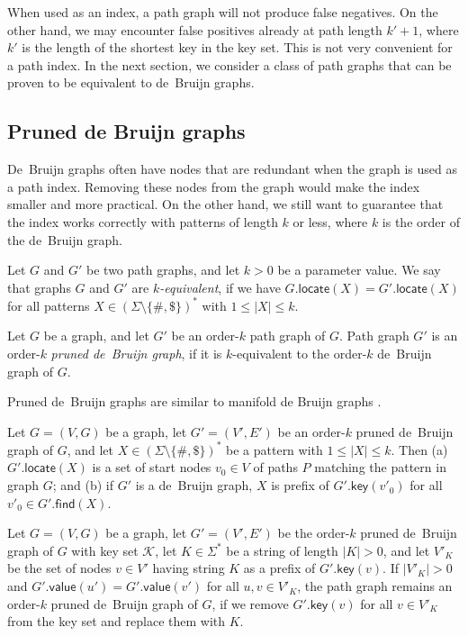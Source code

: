 \documentclass[a4paper,UKenglish]{lipics-v2016}
\newcommand{\set}[1]{\ensuremath{\{ #1 \}}}
\newcommand{\abs}[1]{\ensuremath{\lvert #1 \rvert}}
\newcommand{\find}{\ensuremath{\mathsf{find}}}
\newcommand{\locate}{\ensuremath{\mathsf{locate}}}
\newcommand{\gkey}{\ensuremath{\mathsf{key}}}
\newcommand{\gvalue}{\ensuremath{\mathsf{value}}}
\newcommand{\kequivalent}[1]{$#1$\nobreakdash-equivalent}
\newcommand{\orderk}[1]{order\nobreakdash-$#1$}
\newcommand{\patternset}{\ensuremath{(\Sigma \setminus \set{\#, \$})^{\ast}}}
\begin{document}
When used as an index, a path graph will not produce false negatives. On the other hand, we may encounter false positives already at path length $k'+1$, where $k'$ is the length of the shortest key in the key set. This is not very convenient for a path index. In the next section, we consider a class of path graphs that can be proven to be equivalent to de~Bruijn graphs.


\subsection{Pruned de Bruijn graphs}

De~Bruijn graphs often have nodes that are redundant when the graph is used as a path index. Removing these nodes from the graph would make the index smaller and more practical. On the other hand, we still want to guarantee that the index works correctly with patterns of length $k$ or less, where $k$ is the order of the de~Bruijn graph.

\begin{definition}
Let $G$ and $G'$ be two path graphs, and let $k > 0$ be a parameter value. We say that graphs $G$ and $G'$ are \emph{\kequivalent{k}}, if we have $G.\locate(X) = G'.\locate(X)$ for all patterns $X \in \patternset$ with $1 \le \abs{X} \le k$.
\end{definition}

\begin{definition}
Let $G$ be a graph, and let $G'$ be an \orderk{k} path graph of $G$. Path graph $G'$ is an \orderk{k} \emph{pruned de~Bruijn graph}, if it is \kequivalent{k} to the \orderk{k} de~Bruijn graph of $G$.
\end{definition}

Pruned de~Bruijn graphs are similar to manifold de Bruijn graphs \cite{Lin2014}.

\begin{lemma}\label{lemma:dbg-fp}
Let $G = (V, G)$ be a graph, let $G' = (V', E')$ be an \orderk{k} pruned de~Bruijn graph of $G$, and let $X \in \patternset$ be a pattern with $1 \le \abs{X} \le k$. Then
(a) $G'.\locate(X)$ is a set of start nodes $v_{0} \in V$ of paths $P$ matching the pattern in graph $G$; and
(b) if $G'$ is a de~Bruijn graph, $X$ is prefix of $G'.\gkey(v'_{0})$ for all $v'_{0} \in G'.\find(X)$.
\end{lemma}

\begin{lemma}[Pruning]\label{lemma:dbg-prune}
Let $G = (V, G)$ be a graph, let $G' = (V', E')$ be the \orderk{k} pruned de~Bruijn graph of $G$ with key set $\mathcal{K}$, let $K \in \Sigma^{\ast}$ be a string of length $\abs{K} > 0$, and let $V'_{K}$ be the set of nodes $v \in V'$ having string $K$ as a prefix of $G'.\gkey(v)$. If $\abs{V'_{K}} > 0$ and $G'.\gvalue(u') = G'.\gvalue(v')$ for all $u, v \in V'_{K}$, the path graph remains an \orderk{k} pruned de~Bruijn graph of $G$, if we remove $G'.\gkey(v)$ for all $v \in V'_{K}$ from the key set and replace them with $K$.
\end{lemma}
\end{document}
